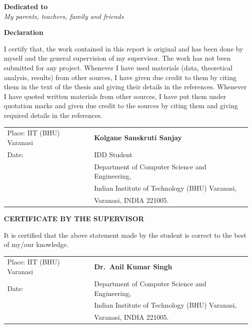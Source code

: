 \documentclass[12pt,a4paper,oneside]{report}
\begin{document}
\newpage
\thispagestyle{empty}
\vspace*{4cm}
\begin{center}
{\Large \textbf{Dedicated to}}\\[1cm]
{\large\itshape My parents, teachers, family and friends}
\end{center}
\clearpage

\newpage
\thispagestyle{plain}
\begin{center}
{\Large \textbf{Declaration}}
\end{center}
\vspace{1cm}

\noindent I certify that, the work contained in this report is original and has been done
by myself and the general supervision of my supervisor. The work has not been submitted
for any project. Whenever I have used materials (data, theoretical analysis, results)
from other sources, I have given due credit to them by citing them in the text of the
thesis and giving their details in the references. Whenever I have quoted written
materials from other sources, I have put them under quotation marks and given due
credit to the sources by citing them and giving required details in the references.

\vspace{1.5cm}
\begin{tabular}{@{}p{5cm}p{8cm}@{}}
Place: IIT (BHU) Varanasi & \textbf{Kolgane Sanskruti Sanjay} \\
Date: & IDD Student \\
& Department of Computer Science and Engineering, \\
& Indian Institute of Technology (BHU) Varanasi, \\
& Varanasi, INDIA 221005. \\
\end{tabular}

\vspace{2cm}
\begin{center}
{\large \textbf{CERTIFICATE BY THE SUPERVISOR}}
\end{center}
\vspace{0.5cm}

\noindent It is certified that the above statement made by the student is correct to
the best of my/our knowledge.

\vspace{1.5cm}
\begin{tabular}{@{}p{5cm}p{8cm}@{}}
Place: IIT (BHU) Varanasi & \textbf{Dr.\ Anil Kumar Singh} \\
Date: & Department of Computer Science and Engineering, \\
& Indian Institute of Technology (BHU) Varanasi, \\
& Varanasi, INDIA 221005. \\
\end{tabular}
\end{document}

